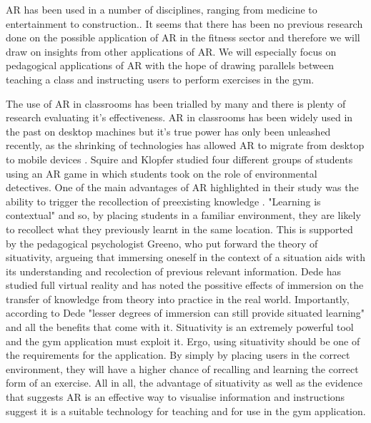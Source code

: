 \documentclass{l4proj}
\begin{document}
\pagebreak

AR has been used in a number of disciplines, ranging from medicine to entertainment to construction.\cite{azuma_recent_2001}. It seems that there has been no previous research done on the possible application of AR in the fitness sector and therefore we will draw on insights from other applications of AR. We will especially focus on pedagogical applications of AR with the hope of drawing parallels between teaching a class and instructing users to perform exercises in the gym. 

The use of AR in classrooms has been trialled by many and there is plenty of research evaluating it's effectiveness. AR in classrooms has been widely used in the past on desktop machines \cite{iordache_comparison_2009} but it's true power has only been unleashed recently, as the shrinking of technologies has allowed AR to migrate from desktop to mobile devices \cite{squire_augmented_2007}. Squire and Klopfer studied four different groups of students using an AR game in which students took on the role of environmental detectives. One of the main advantages of AR highlighted in their study was the ability to trigger the recollection of preexisting knowledge \cite{squire_augmented_2007}. "Learning is contextual" \cite{liestol_learning_2011} and so, by placing students in a familiar environment, they are likely to recollect what they previously learnt in the same location. This is supported by the pedagogical psychologist Greeno, who put forward the theory of situativity, argueing that immersing oneself in the context of a situation aids with its understanding and recolection of previous relevant information\cite{greeno_situativity_1998}. Dede has studied full virtual reality and has noted the possitive effects of immersion on the transfer of knowledge from theory into practice in the real world\cite{dede_immersive_2009}. Importantly, according to Dede "lesser degrees of immersion can still provide situated learning" and all the benefits that come with it\cite{dede_immersive_2009}. Situativity is an extremely powerful tool and the gym application must exploit it. Ergo, using situativity should be one of the requirements for the application. By simply by placing users in the correct environment, they will have a higher chance of recalling and learning the correct form of an exercise. All in all, the advantage of situativity as well as the evidence that suggests AR is an effective way to visualise information and instructions \cite{squire_augmented_2007} suggest it is a suitable technology for teaching and for use in the gym application.
\end{document}
